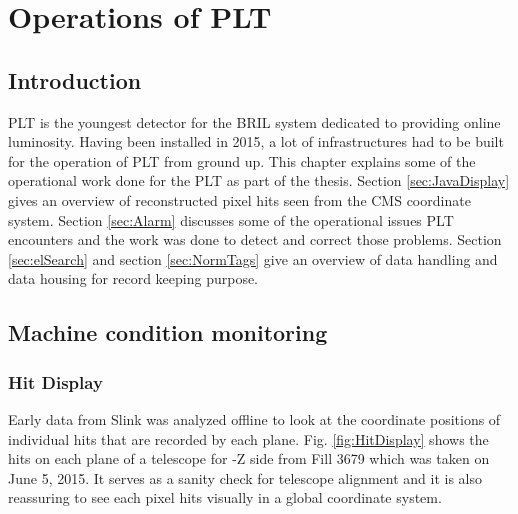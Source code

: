 \chapter{Operations of PLT} \label{ch:operations}
\section{Introduction}


PLT is the youngest detector for the BRIL system dedicated to providing online luminosity. Having been installed in 2015, a lot of infrastructures had to be built for the operation of PLT from ground up. This chapter explains some of the operational work done for the PLT as part of the thesis. Section \ref{sec:JavaDisplay} gives an overview of reconstructed pixel hits seen from the CMS coordinate system. Section \ref{sec:Alarm} discusses some of the operational issues PLT encounters and the work was done to detect and correct those problems. Section \ref{sec:elSearch} and  section \ref{sec:NormTags} give an overview of data handling and data housing for record keeping purpose.


\section{Machine condition monitoring}

\subsection{Hit Display}\label{sec:HitDisplay}
Early data from Slink was analyzed offline to look at the coordinate positions of individual hits that are recorded by each plane. Fig. \ref{fig:HitDisplay} shows the hits on each plane of a telescope for -Z side from Fill 3679 which was taken on June 5, 2015. It serves as a sanity check for telescope alignment and it is also reassuring to see each pixel hits visually in a global coordinate system.

